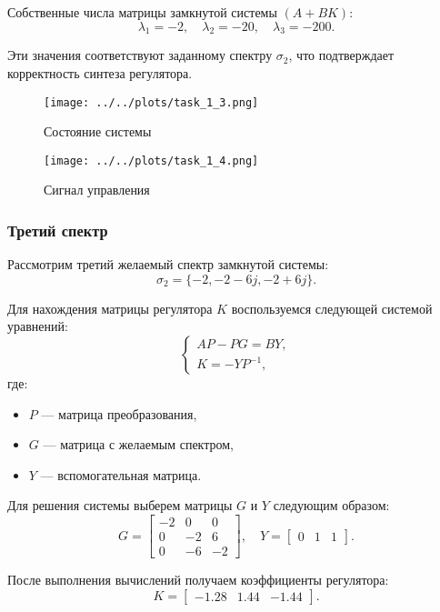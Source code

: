 Собственные числа матрицы замкнутой системы $(A + BK)$:
\[
\lambda_1 = -2, \quad \lambda_2 = -20, \quad \lambda_3 = -200.
\]

Эти значения соответствуют заданному спектру $\sigma_2$, что подтверждает корректность синтеза регулятора.

\begin{figure}[H]
    \centering
    \texttt{[image: ../../plots/task\_1\_3.png]}
    \caption{Состояние системы}
    \label{fig:task_1_state_system_2}
\end{figure}

\begin{figure}[H]
    \centering
    \texttt{[image: ../../plots/task\_1\_4.png]}
    \caption{Сигнал управления}
    \label{fig:task_1_control_signal_2}
\end{figure}


\subsubsection{Третий спектр}

Рассмотрим третий желаемый спектр замкнутой системы:
\[
\sigma_2 = \{-2, -2-6j, -2+6j\}.
\]

Для нахождения матрицы регулятора $K$ воспользуемся следующей системой уравнений:
\[
\begin{cases}
AP - PG = BY, \\
K = -Y P^{-1},
\end{cases}
\]
где:
\begin{itemize}
    \item $P$ — матрица преобразования,
    \item $G$ — матрица с желаемым спектром,
    \item $Y$ — вспомогательная матрица.
\end{itemize}

Для решения системы выберем матрицы $G$ и $Y$ следующим образом:
\[
G = \begin{bmatrix}
-2 & 0 & 0 \\
0 & -2 & 6 \\
0 & -6 & -2
\end{bmatrix}, \quad
Y = \begin{bmatrix}
0 & 1 & 1
\end{bmatrix}.
\]

После выполнения вычислений получаем коэффициенты регулятора:
\[
K = \begin{bmatrix}
-1.28 & 1.44 & -1.44
\end{bmatrix}.
\]

